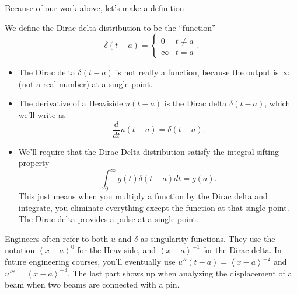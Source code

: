 {Because of our work above, let's make a definition
\begin{definition}
We define the Dirac delta distribution to be the ``function'' 
$$\delta(t-a) = \begin{cases}0 &t\neq a\\\infty &t=a\end{cases}.$$ 
\begin{itemize}
 \item The Dirac delta $\delta(t-a)$ is not really a function, because the output is $\infty$ (not a real number) at a single point.
\item The derivative of a Heaviside $u(t-a)$ is the Dirac delta $\delta(t-a)$, which we'll write as
 $$\frac{d}{dt}u(t-a) = \delta(t-a).$$
\item We'll require that the Dirac Delta distribution satisfy the integral sifting property
$$%
\int_0^\infty g(t)\delta(t-a)dt = g(a).$$
This just means when you multiply a function by the Dirac delta and integrate, you eliminate everything except the function at that single point. The Dirac delta provides a pulse at a single point.
\end{itemize}
Engineers often refer to both $u$ and $\delta$ as singularity functions. They use the notation $\left<x-a\right>^0$ for the Heaviside, and $\left<x-a\right>^{-1}$ for the Dirac delta. In future engineering courses, you'll eventually use $u''(t-a) = \left<x-a\right>^{-2}$ and $u'''=\left<x-a\right>^{-3}$. The last part shows up when analyzing the displacement of a beam when two beams are connected with a pin.
\end{definition}
}





